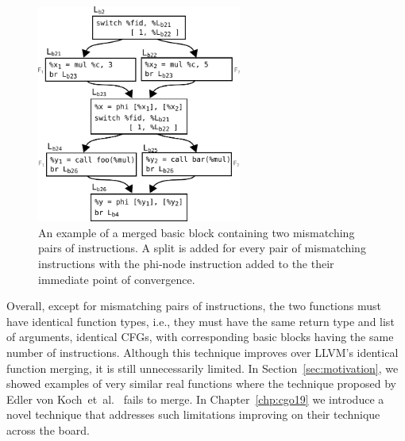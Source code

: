 \begin{figure}[h]
  \centering
  \includegraphics[width=0.6\textwidth]{src/relatedwork/figs/soa-example-2.pdf}
  \caption{An example of a merged basic block containing two mismatching pairs of instructions. A split is added for every pair of mismatching instructions with the phi-node instruction added to the their immediate point of convergence.}
  \label{fig:soa-example-2}
\end{figure}

Overall, except for mismatching pairs of instructions, the two functions must have identical function types, i.e., they must have the same return type and list of arguments, identical CFGs, with corresponding basic blocks having the same number of instructions.
Although this technique improves over LLVM's identical function merging, it is
still unnecessarily limited.
In Section~\ref{sec:motivation}, we showed examples of very similar real functions where the technique proposed by Edler von Koch~et~al.~\cite{edler14} fails to merge.
In Chapter~\ref{chp:cgo19} we introduce a novel technique that addresses such limitations improving on their technique across the board.


